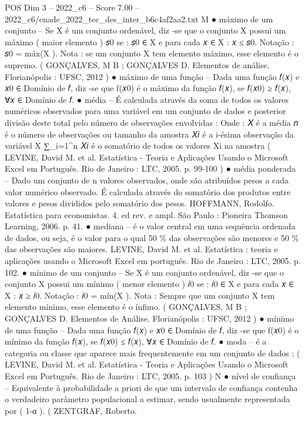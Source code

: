 \begin{textsample}{POS Dim 3 – 2022\_c6 – Score 7.00 – 2022\_c6/enade\_2022\_tec\_des\_inter\_b6c4af2aa2.txt}
M {\EmojiFont ●} máximo de um conjunto – Se X é um conjunto ordenável, diz -se que o conjunto X possui um máximo ( maior elemento ) 𝑠0 se : 𝑠0 ∈ X e para cada 𝑥 ∈ X : 𝑥 ≤ 𝑠0.
Notação : 𝑠0 = máx(X ).
Nota : se um conjunto X tem elemento máximo, esse elemento é o supremo. ( GONÇALVES, M B ; GONÇALVES D.
Elementos de análise.
Florianópolis : UFSC, 2012 ) {\EmojiFont ●} máximo de uma função – Dada uma função 𝑓(𝑥) e 𝑥0 ∈ Domínio de 𝑓, diz -se que f(𝑥0) é o máximo da função 𝑓(𝑥), se 𝑓(𝑥0) ≥ 𝑓(𝑥), ∀𝑥 ∈ Domínio de 𝑓. {\EmojiFont ●} média – É calculada através da soma de todos os valores numéricos observados para uma variável em um conjunto de dados e posterior divisão deste total pelo número de observações envolvidas : Onde : 𝑋 é a média 𝑛 é o número de observações ou tamanho da amostra 𝑋𝑖 é a i-ésima observação da variável X ∑\_i=1\textasciicircum{}n 𝑋𝑖 é o somatório de todos os valores Xi na amostra ( LEVINE, David M. et al.
Estatística - Teoria e Aplicações Usando o Microsoft Excel em Português.
Rio de Janeiro : LTC, 2005. p. 99-100 ) {\EmojiFont ●} média ponderada – Dado um conjunto de n valores observados, onde são atribuídos pesos a cada valor numérico observado.
É calculada através do somatório dos produtos entre valores e pesos divididos pelo somatório dos pesos.
HOFFMANN, Rodolfo.
Estatística para economistas. 4. ed rev. e ampl.
São Paulo : Pioneira Thomson Learning, 2006. p. 41. {\EmojiFont ●} mediana – é o valor central em uma sequência ordenada de dados, ou seja, é o valor para o qual 50 \% das observações são menores e 50 \% das observações são maiores.
LEVINE, David M. et al.
Estatística : teoria e aplicações usando o Microsoft Excel em português.
Rio de Janeiro : LTC, 2005. p. 102. {\EmojiFont ●} mínimo de um conjunto – Se X é um conjunto ordenável, diz -se que o conjunto X possui um mínimo ( menor elemento ) 𝑖0 se : 𝑖0 ∈ X e para cada 𝑥 ∈ X : 𝑥 ≥ 𝑖0.
Notação : 𝑖0 = mín(X ).
Nota : Sempre que um conjunto X tem elemento mínimo, esse elemento é o ínfimo. ( GONÇALVES, M B ; GONÇALVES D.
Elementos de Análise.
Florianópolis : UFSC, 2012 ) {\EmojiFont ●} mínimo de uma função – Dada uma função 𝑓(𝑥) e 𝑥0 ∈ Domínio de 𝑓, diz -se que f(𝑥0) é o mínimo da função 𝑓(𝑥), se 𝑓(𝑥0) ≤ 𝑓(𝑥), ∀𝑥 ∈ Domínio de 𝑓. {\EmojiFont ●} moda – é a categoria ou classe que aparece mais frequentemente em um conjunto de dados ; ( LEVINE, David M. et al.
Estatística - Teoria e Aplicações Usando o Microsoft Excel em Português.
Rio de Janeiro : LTC, 2005. p. 103 ) N {\EmojiFont ●} nível de confiança – Equivalente à probabilidade a priori de que um intervalo de confiança contenha o verdadeiro parâmetro populacional a estimar, sendo usualmente representada por ( 1-α ). ( ZENTGRAF, Roberto.

\end{textsample}
